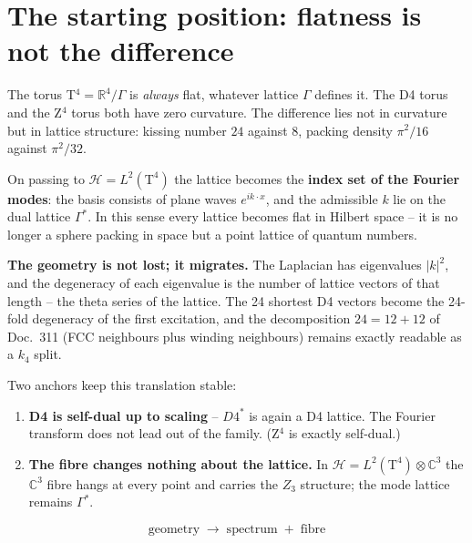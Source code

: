 \chapter{The starting position: flatness is not the difference}

The torus T$^4 = \mathbb{R}^4/\Gamma$ is \emph{always} flat,
whatever lattice $\Gamma$ defines it. The D4 torus and the Z$^4$
torus both have zero curvature. The difference lies not in curvature
but in lattice structure: kissing number $24$ against $8$, packing
density $\pi^2/16$ against $\pi^2/32$.

On passing to $\mathcal{H} = L^2(\text{T}^4)$ the lattice becomes
the \textbf{index set of the Fourier modes}: the basis consists of
plane waves $e^{ik\cdot x}$, and the admissible $k$ lie on the dual
lattice $\Gamma^{*}$. In this sense every lattice becomes flat in
Hilbert space -- it is no longer a sphere packing in space but a
point lattice of quantum numbers.

\textbf{The geometry is not lost; it migrates.} The Laplacian has
eigenvalues $|k|^2$, and the degeneracy of each eigenvalue is the
number of lattice vectors of that length -- the theta series of the
lattice. The 24 shortest D4 vectors become the 24-fold degeneracy of
the first excitation, and the decomposition $24 = 12+12$ of Doc.~311
(FCC neighbours plus winding neighbours) remains exactly readable as
a $k_4$ split.

Two anchors keep this translation stable:

\begin{enumerate}
  \item \textbf{D4 is self-dual up to scaling} -- $D4^{*}$ is again a
        D4 lattice. The Fourier transform does not lead out of the
        family. (Z$^4$ is exactly self-dual.)
  \item \textbf{The fibre changes nothing about the lattice.} In
        $\mathcal{H} = L^2(\text{T}^4)\otimes\mathbb{C}^3$ the
        $\mathbb{C}^3$ fibre hangs at every point and carries the
        $Z_3$ structure; the mode lattice remains $\Gamma^{*}$.
\end{enumerate}

\begin{equation}
  \boxed{\;\text{geometry}\;\longrightarrow\;
  \text{spectrum}\;+\;\text{fibre}\;}
\end{equation}

